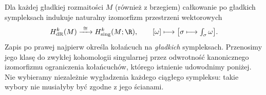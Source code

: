 \begin{twierdzenie}[de Rham]
\label{thm:de-rham}
Dla każdej gładkiej rozmaitości $M$ (również z brzegiem)
całkowanie po gładkich sympleksach indukuje naturalny
izomorfizm przestrzeni wektorowych
\begin{equation}\label{eq:de-rham-iso}
 H^k_{\mathrm{dR}}(M)\xrightarrow{\ \cong\ }
 H^k_{\mathrm{sing}}(M;\R),
 \qquad [\omega]\longmapsto
 \bigl[\sigma\longmapsto\textstyle\int_\sigma\omega\bigr].
\end{equation}
Zapis po prawej najpierw określa kołańcuch na
\emph{gładkich} sympleksach. Przenosimy jego klasę do
zwykłej kohomologii singularnej przez odwrotność
kanonicznego izomorfizmu ograniczenia kołańcuchów,
którego istnienie udowodnimy poniżej. Nie wybieramy
niezależnie wygładzenia każdego ciągłego sympleksu:
takie wybory nie musiałyby być zgodne z jego ścianami.
\end{twierdzenie}
